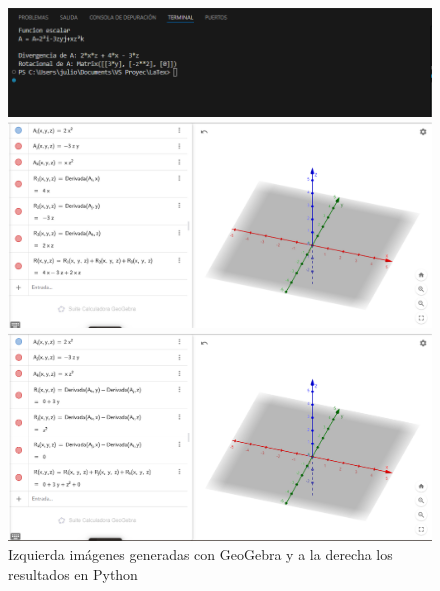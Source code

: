\documentclass{article}
\begin{document}
\begin{figure}[h!]
    \begin{minipage}{0.45\textwidth}
        \centering
        \includegraphics[width=\textwidth]{imgs/Div_Rot_python.png}
    \end{minipage}
    \hfill
    \begin{minipage}{0.45\textwidth}
        \centering
        \includegraphics[width=\textwidth]{imgs/divergencia_Geogebra.png}
    \end{minipage}
    
    \vspace{0.5cm}
    
    \begin{minipage}{0.45\textwidth}
        \centering
        \includegraphics[width=\textwidth]{imgs/Rotacional_Geogebra.png}
    \end{minipage}
    
    \caption{Izquierda imágenes generadas con GeoGebra y a la derecha los resultados en Python}
\end{figure}
\end{document}

